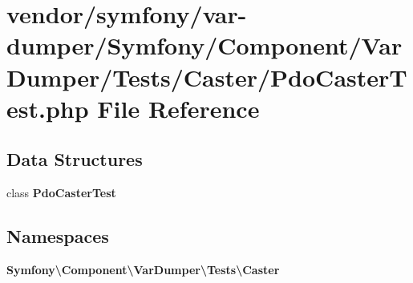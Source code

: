 \section{vendor/symfony/var-\/dumper/\+Symfony/\+Component/\+Var\+Dumper/\+Tests/\+Caster/\+Pdo\+Caster\+Test.php File Reference}
\label{_pdo_caster_test_8php}
\subsection*{Data Structures}
\begin{DoxyCompactItemize}
\item 
class {\bf Pdo\+Caster\+Test}
\end{DoxyCompactItemize}
\subsection*{Namespaces}
\begin{DoxyCompactItemize}
\item 
 {\bf Symfony\textbackslash{}\+Component\textbackslash{}\+Var\+Dumper\textbackslash{}\+Tests\textbackslash{}\+Caster}
\end{DoxyCompactItemize}
